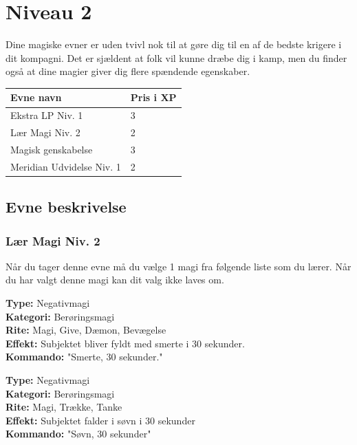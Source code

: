 \chapter{Niveau 2}
Dine magiske evner er uden tvivl nok til at gøre dig til en af de bedste krigere i dit kompagni. Det er sjældent at folk vil kunne dræbe dig i kamp, men du finder også at dine magier giver dig flere spændende egenskaber.
\begin{table}[H]
    \centering
    \begin{tabular}{|p{}|p{}|}
    \rowcolor{cerulean!80}\hline
    Evne navn & Pris i XP \\\hline
       Ekstra LP Niv. 1 & 3 \\\hline
       Lær Magi Niv. 2 & 2 \\\hline
       Magisk genskabelse & 3 \\\hline
       Meridian Udvidelse Niv. 1 & 2 \\\hline
    \end{tabular}
\end{table}
\section{Evne beskrivelse}



\subsection{Lær Magi Niv. 2}
Når du tager denne evne må du vælge 1 magi fra følgende liste som du lærer. Når du har valgt denne magi kan dit valg ikke laves om.

\begin{lærmagi*}[Smerte]
\textbf{Type:} Negativmagi\\
\textbf{Kategori:} Berøringsmagi\\
\textbf{Rite:} Magi, Give, Dæmon, Bevægelse\\
\textbf{Effekt:} Subjektet bliver fyldt med smerte i 30 sekunder.\\
\textbf{Kommando:} "Smerte, 30 sekunder."\\
\end{lærmagi*}

\begin{lærmagi*}[Søvn]
\textbf{Type:} Negativmagi\\
\textbf{Kategori:} Berøringsmagi\\
\textbf{Rite:} Magi, Trække, Tanke\\
\textbf{Effekt:} Subjektet falder i søvn i 30 sekunder\\
\textbf{Kommando:} "Søvn, 30 sekunder"\\
\end{lærmagi*}


